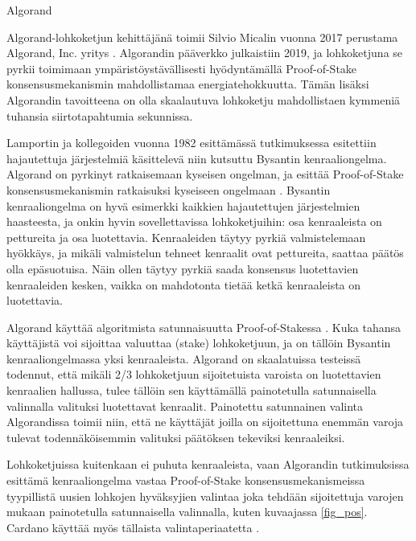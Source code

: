 \begin{subsection}{Algorand\label{algorand0}}
\begin{otherlanguage}{finnish}

Algorand-lohkoketjun kehittäjänä toimii Silvio Micalin vuonna 2017 perustama Algorand, Inc. yritys \cite{algorandwhitepaper}. Algorandin pääverkko julkaistiin 2019, ja lohkoketjuna se pyrkii toimimaan ympäristöystävällisesti hyödyntämällä Proof-of-Stake konsensusmekanismin mahdollistamaa energiatehokkuutta. Tämän lisäksi Algorandin tavoitteena on olla skaalautuva lohkoketju mahdollistaen kymmeniä tuhansia siirtotapahtumia sekunnissa.

Lamportin ja kollegoiden vuonna 1982 esittämässä tutkimuksessa \cite{byzantine} esitettiin hajautettuja järjestelmiä käsittelevä niin kutsuttu Bysantin kenraaliongelma. Algorand on pyrkinyt ratkaisemaan kyseisen ongelman, ja esittää Proof-of-Stake konsensusmekanismin ratkaisuksi kyseiseen ongelmaan \cite{algorandtech}. Bysantin kenraaliongelma on hyvä esimerkki kaikkien hajautettujen järjestelmien haasteesta, ja onkin hyvin sovellettavissa lohkoketjuihin: osa kenraaleista on pettureita ja osa luotettavia. Kenraaleiden täytyy pyrkiä valmistelemaan hyökkäys, ja mikäli valmistelun tehneet kenraalit ovat pettureita, saattaa päätös olla epäsuotuisa. Näin ollen täytyy pyrkiä saada konsensus luotettavien kenraaleiden kesken, vaikka on mahdotonta tietää ketkä kenraaleista on luotettavia.

Algorand käyttää algoritmista satunnaisuutta Proof-of-Stakessa \cite{algorandtech}. Kuka tahansa käyttäjistä voi sijoittaa valuuttaa (stake) lohkoketjuun, ja on tällöin Bysantin kenraaliongelmassa yksi kenraaleista. Algorand on skaalatuissa testeissä todennut, että mikäli 2/3 lohkoketjuun sijoitetuista varoista on luotettavien kenraalien hallussa, tulee tällöin sen käyttämällä painotetulla satunnaisella valinnalla valituksi luotettavat kenraalit. Painotettu satunnainen valinta Algorandissa toimii niin, että ne käyttäjät joilla on sijoitettuna enemmän varoja tulevat todennäköisemmin valituksi päätöksen tekeviksi kenraaleiksi.

Lohkoketjuissa kuitenkaan ei puhuta kenraaleista, vaan Algorandin tutkimuksissa esittämä kenraaliongelma vastaa Proof-of-Stake konsensusmekanismeissa tyypillistä uusien lohkojen hyväksyjien valintaa joka tehdään sijoitettuja varojen mukaan painotetulla satunnaisella valinnalla, kuten kuvaajassa \ref{fig_pos}. Cardano käyttää myös tällaista valintaperiaatetta \cite{cardanowhitepaper}.


\end{otherlanguage}
\end{subsection}
